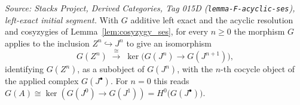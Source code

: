 \begin{lemma}
  \label{lem:applied_cosyzygy_cycles}
  \textit{Source: Stacks Project, Derived Categories, Tag 015D
  (\texttt{lemma-F-acyclic-ses}), left-exact initial segment.}
  With \(G\) additive left exact and the acyclic resolution and cosyzygies of
  Lemma~\ref{lem:cosyzygy_ses}, for every \(n \geq 0\) the morphism \(G\) applies to
  the inclusion \(Z^n \hookrightarrow J^n\) to give an isomorphism
  \[
    G(Z^n) \;\xrightarrow{\ \cong\ }\; \ker\bigl(G(J^n) \to G(J^{n+1})\bigr),
  \]
  identifying \(G(Z^n)\), as a subobject of \(G(J^n)\), with the \(n\)-th cocycle
  object of the applied complex \(G(J^\bullet)\). For \(n = 0\) this reads
  \(G(A) \cong \ker(G(J^0) \to G(J^1)) = H^0\bigl(G(J^\bullet)\bigr)\).
\end{lemma}

